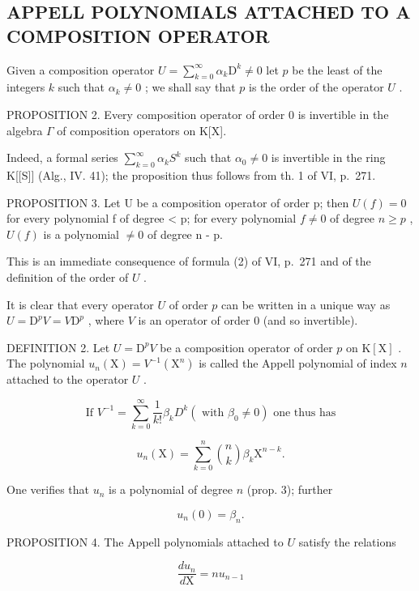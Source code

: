 \subsection{APPELL POLYNOMIALS ATTACHED TO A COMPOSITION OPERATOR}

Given a composition operator \(U = \sum_{k=0}^{\infty} \alpha_k \mathrm{D}^k \neq 0\) let \(p\) be the least of the integers \(k\) such that \(\alpha_k \neq 0\) ; we shall say that \(p\) is the order of the operator \(U\) .

PROPOSITION 2. Every composition operator of order 0 is invertible in the algebra \(\Gamma\) of composition operators on K{[}X{]}.

Indeed, a formal series \(\sum_{k=0}^{\infty}\alpha_{k}S^{k}\) such that \(\alpha_{0}\neq0\) is invertible in the ring K{[}{[}S{]}{]} (Alg., IV. 41); the proposition thus follows from th. 1 of VI, p.~271.

PROPOSITION 3. Let U be a composition operator of order p; then \(U(f) = 0\) for every polynomial f of degree \textless{} p; for every polynomial \(f \neq 0\) of degree \(n \geqslant p\) , \(U(f)\) is a polynomial \(\neq 0\) of degree n - p.

This is an immediate consequence of formula (2) of VI, p.~271 and of the definition of the order of \(U\) .

It is clear that every operator \(U\) of order \(p\) can be written in a unique way as \(U = \mathrm{D}^p V = V\mathrm{D}^p\) , where \(V\) is an operator of order 0 (and so invertible).

DEFINITION 2. Let \(U = \mathrm{D}^p V\) be a composition operator of order \(p\) on \(\mathrm{K}[\mathrm{X}]\) . The polynomial \(u_n(\mathrm{X}) = V^{-1}(\mathrm{X}^n)\) is called the Appell polynomial of index \(n\) attached to the operator \(U\) .

\[
\text {   If   } V ^ {- 1} = \sum_ {k = 0} ^ {\infty} \frac {1}{k !} \beta_ {k} D ^ {k} (\text {   with   } \beta_ {0} \neq 0) \text {   one   thus   has   }
\]

\[
u _ {n} (\mathrm{X}) = \sum_ {k = 0} ^ {n} {\binom {n} {k}} \beta_ {k}   \mathrm{X} ^ {n - k}.\tag{6}
\]

One verifies that \(u_{n}\) is a polynomial of degree \(n\) (prop. 3); further

\[
u _ {n} (0) = \beta_ {n}.
\]

PROPOSITION 4. The Appell polynomials attached to \(U\) satisfy the relations

\[
\frac {d u _ {n}}{d \mathrm{X}} = n u _ {n - 1}\tag{7}
\]

